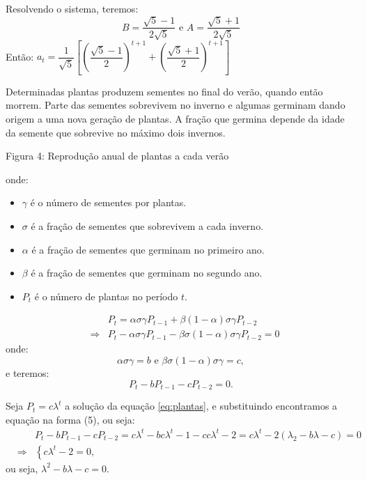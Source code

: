 Resolvendo o sistema, teremos:
$$B = \dfrac{\sqrt{5}-1}{2\sqrt{5}} \mbox{ e } A = \dfrac{\sqrt{5}+1}{2\sqrt{5}}$$
Então: $a_t = \dfrac{1}{\sqrt{5}} \left[\left(\dfrac{\sqrt{5}-1}{2}\right)^{t+1} + \left(\dfrac{\sqrt{5}+1}{2}\right)^{t+1}\right]$

\begin{example}
Determinadas plantas produzem sementes no final do verão, quando então morrem. Parte das sementes sobrevivem no inverno e algumas germinam dando origem a uma nova geração de plantas. A fração que germina depende da idade da semente que sobrevive no máximo dois invernos. 

Figura 4: Reprodução anual de plantas a cada verão 

onde:

\begin{itemize}
\item $\gamma$ é o número de sementes por plantas.
\item $\sigma$ é a fração de sementes que sobrevivem a cada inverno.
\item $\alpha$ é a fração de sementes que germinam no primeiro ano.
\item $\beta$ é a fração de sementes que germinam no segundo ano.
\item $P_t$ é o número de plantas no período $t$.
\end{itemize}
$$\begin{array}{rcl}
& & P_t = \alpha \sigma \gamma P_{t-1} + \beta (1-\alpha) \sigma \gamma P_{t-2} \\
&\Rightarrow&
P_t - \alpha \sigma \gamma P_{t-1} - \beta\sigma (1-\alpha) \sigma \gamma P_{t-2} = 0
\end{array}$$
onde:
$$\alpha \sigma \gamma  = b \mbox{ e } \beta \sigma (1-\alpha) \sigma \gamma  = c,$$
e teremos:
\begin{equation}\label{eq:plantas}
P_t - bP_{t-1} - cP_{t-2} = 0.
\end{equation}

Seja $P_t = c\lambda^{t}$ a solução da equação \eqref{eq:plantas}, e substituindo encontramos a equação na forma (5), ou seja:
$$\begin{array}{rcl}
& & P_t-bP_{t-1}-cP_{t-2} = c\lambda^{t}-bc\lambda^{t}-1-cc\lambda^{t}-2 = c \lambda^{t}-2 (\lambda_{2}-b\lambda-c) = 0 \\
&\Rightarrow&  \left\{ c\lambda^{t}-2 = 0 \right.,
\end{array}$$
ou seja, $\lambda^{2} - b\lambda - c =0$.


\end{example}
